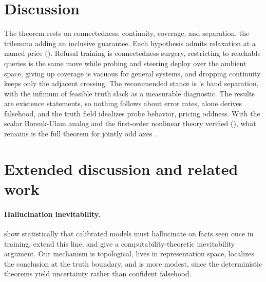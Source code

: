 \documentclass[mlmain,onecolumn]{jmlr}
\begin{document}
\section{Discussion}
\label{sec:discussion}

The theorem rests on connectedness, continuity, coverage, and
separation, the trilemma adding an inclusive guarantee. Each
hypothesis admits relaxation at a named price
(). Refusal training is connectedness
surgery, restricting to reachable queries is the same move while
probing and steering deploy over the ambient space, giving up
coverage is vacuous for general systems, and dropping continuity
keeps only the adjacent crossing. The recommended stance is
's band separation, with the infimum of
feasible truth slack as a measurable diagnostic. The results are
existence statements, so nothing follows about error rates,
 alone derives falsehood, and the truth
field idealizes probe behavior,  pricing
oddness. With the scalar Borsuk-Ulam analog and the first-order
nonlinear theory verified (), what
remains is the full theorem for jointly odd axes
\citep{engels2025not}.




\appendix

\section{Extended discussion and related work}
\label{app:extended}

\paragraph{Hallucination inevitability.}
\citet{kalai2024calibrated} show statistically that calibrated
models must hallucinate on facts seen once in training,
\citet{kalai2025why} extend this line, and
\citet{xu2024hallucination} give a computability-theoretic
inevitability argument. Our mechanism is topological, lives in
representation space, localizes the conclusion at the truth
boundary, and is more modest, since the deterministic theorems
yield uncertainty rather than confident falsehood.
\end{document}
